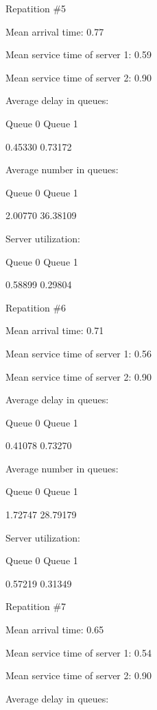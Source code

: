 \documentclass{article}
\begin{document}
 Repatition \#5

Mean arrival time: 0.77

Mean service time of server 1: 0.59

Mean service time of server 2: 0.90



Average delay in queues:

Queue 0		Queue 1		



0.45330		0.73172		



Average number in queues:

Queue 0		Queue 1		



2.00770		36.38109		



Server utilization:

Queue 0		Queue 1		



0.58899		0.29804		



 Repatition \#6

Mean arrival time: 0.71

Mean service time of server 1: 0.56

Mean service time of server 2: 0.90



Average delay in queues:

Queue 0		Queue 1		



0.41078		0.73270		



Average number in queues:

Queue 0		Queue 1		



1.72747		28.79179		



Server utilization:

Queue 0		Queue 1		



0.57219		0.31349		



 Repatition \#7

Mean arrival time: 0.65

Mean service time of server 1: 0.54

Mean service time of server 2: 0.90



Average delay in queues:
\end{document}
